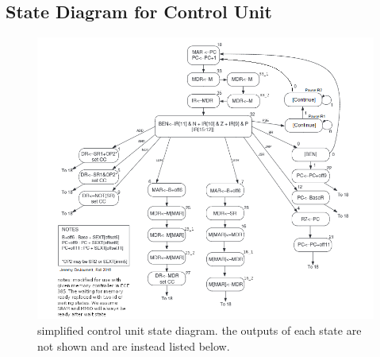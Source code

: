 \documentclass[a4paper,12pt]{report}
\begin{document}
\subsection{State Diagram for Control Unit}
\begin{figure}[h]
    \begin{center}
        \includegraphics[scale=2.5]{fsm}
        \caption{simplified control unit state diagram. the outputs of each state are not shown and are instead listed below.}
    \end{center}
\end{figure}
\pagebreak
\end{document}
